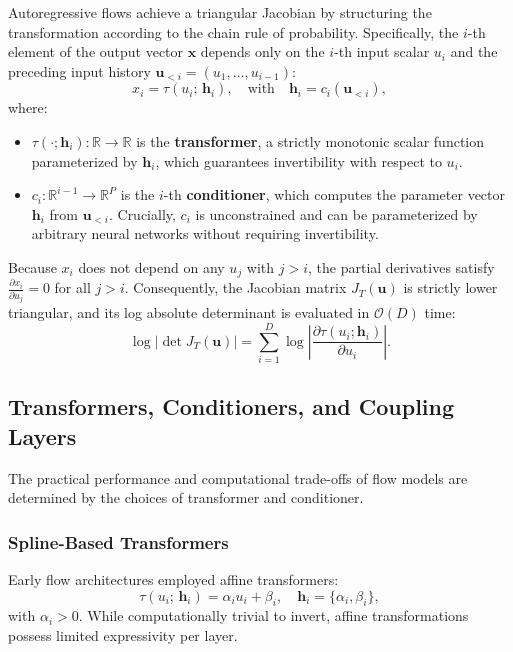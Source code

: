 \documentclass[12pt]{article}
\renewcommand{\vec}[1]{\boldsymbol{\mathbf{#1}}}
\begin{document}
        Autoregressive flows achieve a triangular Jacobian by structuring the transformation according to the chain rule of probability. Specifically, the $i$-th element of the output vector $\vec{x}$ depends only on the $i$-th input scalar $u_i$ and the preceding input history $\vec{u}_{<i} = (u_1, \dots, u_{i-1})$:
        \begin{equation}
            x_i = \tau(u_i; \, \vec{h}_i), \quad \text{with} \quad \vec{h}_i = c_i(\vec{u}_{<i}),
            \label{eq:autoregressive_flow_step}
        \end{equation}
        where:
        \begin{itemize}
            \item $\tau(\cdot; \vec{h}_i): \mathbb{R} \to \mathbb{R}$ is the \textbf{transformer}, a strictly monotonic scalar function parameterized by $\vec{h}_i$, which guarantees invertibility with respect to $u_i$.
            \item $c_i: \mathbb{R}^{i-1} \to \mathbb{R}^P$ is the $i$-th \textbf{conditioner}, which computes the parameter vector $\vec{h}_i$ from $\vec{u}_{<i}$. Crucially, $c_i$ is unconstrained and can be parameterized by arbitrary neural networks without requiring invertibility.
        \end{itemize}
        Because $x_i$ does not depend on any $u_j$ with $j > i$, the partial derivatives satisfy $\frac{\partial x_i}{\partial u_j} = 0$ for all $j > i$. Consequently, the Jacobian matrix $J_T(\vec{u})$ is strictly lower triangular, and its log absolute determinant is evaluated in $\mathcal{O}(D)$ time:
        \begin{equation}
            \log \left| \det J_T(\vec{u}) \right| = \sum_{i=1}^D \log \left| \frac{\partial \tau(u_i; \vec{h}_i)}{\partial u_i} \right|.
        \end{equation}


    \subsection{Transformers, Conditioners, and Coupling Layers}%
    \label{sub:transformers_conditioners_and_coupling_layers}

        The practical performance and computational trade-offs of flow models are determined by the choices of transformer and conditioner.

        \subsubsection{Spline-Based Transformers}
        Early flow architectures employed affine transformers:
        \begin{equation}
            \tau(u_i; \, \vec{h}_i) = \alpha_i u_i + \beta_i, \quad \vec{h}_i = \{\alpha_i, \beta_i\},
        \end{equation}
        with $\alpha_i > 0$. While computationally trivial to invert, affine transformations possess limited expressivity per layer.
\end{document}
